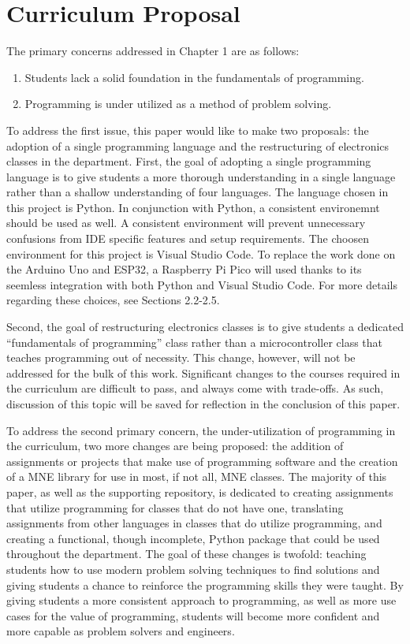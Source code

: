 \section{Curriculum Proposal}

The primary concerns addressed in Chapter 1 are as follows:

\begin{enumerate}
    \item Students lack a solid foundation in the fundamentals of programming.
    \item Programming is under utilized as a method of problem solving.
\end{enumerate}
To address the first issue, this paper would like to make two proposals: the adoption of a single programming 
language and the restructuring of electronics classes in the department. First, the goal of adopting a single 
programming language is to give students a more thorough understanding in a single language rather than 
a shallow understanding of four languages. The language chosen in this project is Python. In conjunction with 
Python, a consistent environemnt should be used as well. A consistent environment will prevent unnecessary 
confusions from IDE specific features and setup requirements. The choosen environment for this project is 
Visual Studio Code. To replace the work done on the Arduino Uno and ESP32, a Raspberry Pi Pico will used 
thanks to its seemless integration with both Python and Visual Studio Code. For more details regarding these 
choices, see Sections 2.2-2.5.

Second, the goal of restructuring electronics classes is to give students a dedicated ``fundamentals of 
programming'' class rather than a microcontroller class that teaches programming out of necessity. This
change, however, will not be addressed for the bulk of this work. Significant changes to the courses
required in the curriculum are difficult to pass, and always come with trade-offs. As such, discussion of 
this topic will be saved for reflection in the conclusion of this paper.

To address the second primary concern, the under-utilization of programming in the curriculum, two more
changes are being proposed: the addition of assignments or projects that make use of programming software
and the creation of a MNE library for use in most, if not all, MNE classes. The majority of this paper, as
well as the supporting repository, is dedicated to creating assignments that utilize programming for classes
that do not have one, translating assignments from other languages in classes that do utilize programming,
and creating a functional, though incomplete, Python package that could be used throughout the department.
The goal of these changes is twofold: teaching students how to use modern problem solving techniques to find 
solutions and giving students a chance to reinforce the programming skills they were taught. By giving
students a more consistent approach to programming, as well as more use cases for the value of programming,
students will become more confident and more capable as problem solvers and engineers.

